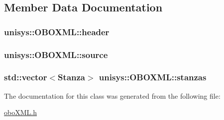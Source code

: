 \subsection{Member Data Documentation}
\hypertarget{classunisys_1_1OBOXML_a964f7b7f3c7056247331a79653abfed1}{
\subsubsection[{header}]{ unisys\-::\-O\-B\-O\-X\-M\-L\-::header\hspace{0.3cm}{\ttfamily [private]}}}\label{classunisys_1_1OBOXML_a964f7b7f3c7056247331a79653abfed1}
\hypertarget{classunisys_1_1OBOXML_a14efe4f902a33eabbbc0bdeb1da941b1}{
\subsubsection[{source}]{ unisys\-::\-O\-B\-O\-X\-M\-L\-::source\hspace{0.3cm}{\ttfamily [private]}}}\label{classunisys_1_1OBOXML_a14efe4f902a33eabbbc0bdeb1da941b1}
\hypertarget{classunisys_1_1OBOXML_a0810c630e347064df2b152cc45987f3c}{
\subsubsection[{stanzas}]{\setlength{\rightskip}{0pt plus 5cm}std\-::vector$<${\bf Stanza}$>$ unisys\-::\-O\-B\-O\-X\-M\-L\-::stanzas\hspace{0.3cm}{\ttfamily [private]}}}\label{classunisys_1_1OBOXML_a0810c630e347064df2b152cc45987f3c}


The documentation for this class was generated from the following file\-:\begin{DoxyCompactItemize}
\item 
\hyperlink{oboXML_8h}{obo\-X\-M\-L.\-h}\end{DoxyCompactItemize}
